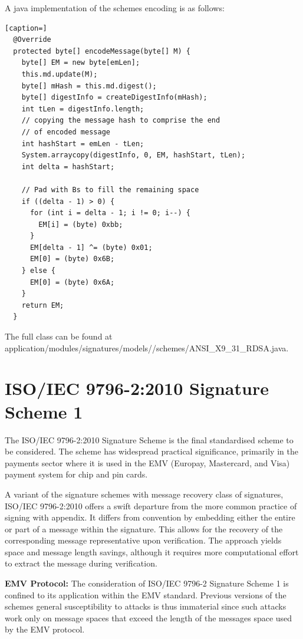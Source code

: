 \documentclass[]{final_report}
\theoremstyle{definition}
\begin{document}
A java implementation of the schemes encoding is as follows: 
\begin{lstlisting}[caption=]
  @Override
  protected byte[] encodeMessage(byte[] M) {
    byte[] EM = new byte[emLen];
    this.md.update(M);
    byte[] mHash = this.md.digest();
    byte[] digestInfo = createDigestInfo(mHash);
    int tLen = digestInfo.length;
    // copying the message hash to comprise the end
    // of encoded message
    int hashStart = emLen - tLen;
    System.arraycopy(digestInfo, 0, EM, hashStart, tLen);
    int delta = hashStart;

    // Pad with Bs to fill the remaining space
    if ((delta - 1) > 0) {
      for (int i = delta - 1; i != 0; i--) {
        EM[i] = (byte) 0xbb;
      }
      EM[delta - 1] ^= (byte) 0x01;
      EM[0] = (byte) 0x6B;
    } else {
      EM[0] = (byte) 0x6A;
    }
    return EM;
  }
\end{lstlisting}
The full class can be found at application/modules/signatures/models//schemes/ANSI\_X9\_31\_RDSA.java.

\section{ISO/IEC 9796-2:2010 Signature Scheme 1}
The ISO/IEC 9796-2:2010 \cite{ISO/2010/9796-2-2010} Signature Scheme is the final standardised scheme to be considered. The scheme has widespread practical significance, primarily in the payments sector where it is used in the EMV (Europay, Mastercard, and Visa) payment system for chip and pin cards. 

A variant of the signature schemes with message recovery class of signatures, ISO/IEC 9796-2:2010 offers a swift departure from the more common practice of signing with appendix. It differs from convention by embedding either the entire or part of a message within the signature. This allows for the recovery of the corresponding message representative upon verification. The approach yields space and message length savings, although it requires more computational effort to extract the message during verification.

\textbf{EMV Protocol:} The consideration of ISO/IEC 9796-2 Signature Scheme 1 is confined to its application within the EMV standard. Previous versions of the schemes general susceptibility to attacks \cite{10.1007/3-540-48405-1_1, coron2016practical} is thus immaterial since such attacks work only on message spaces that exceed the length of the messages space used by the EMV protocol.
\end{document}

